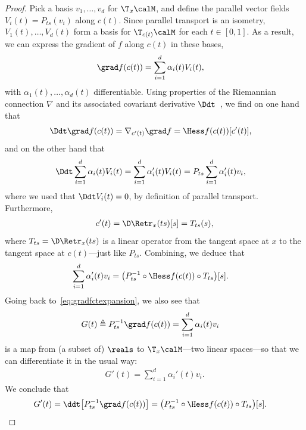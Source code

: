 \begin{proof}
	Pick a basis $v_1, \ldots, v_d$ for $\T_x\calM$, and define the parallel vector fields $V_i(t) = P_{ts}(v_i)$ along $c(t)$. Since parallel transport is an isometry, $V_1(t), \ldots, V_d(t)$ form a basis for $\T_{c(t)}\calM$ for each $t \in [0, 1]$. As a result, we can express the gradient of $f$ along $c(t)$ in these bases,
	\begin{align}
		\grad f(c(t)) & = \sum_{i = 1}^{d} \alpha_i(t) V_i(t),
		\label{eq:gradfctexpansion}
	\end{align}
	with $\alpha_1(t), \ldots, \alpha_d(t)$ differentiable. Using properties of the Riemannian connection $\nabla$ and its associated covariant derivative $\Ddt$~\cite[pp59--67]{oneill}, we find on one hand that
	\begin{align*}
		\Ddt \grad f(c(t)) & = \nabla_{c'(t)} \grad f = \Hess f(c(t))[c'(t)],
	\end{align*}
	and on the other hand that
	\begin{align*}
		\Ddt \sum_{i = 1}^{d} \alpha_i(t) V_i(t) & = \sum_{i = 1}^{d} \alpha_i'(t) V_i(t) = P_{ts} \sum_{i = 1}^{d} \alpha_i'(t) v_i,
	\end{align*}
	where we used that $\Ddt V_i(t) = 0$, by definition of parallel transport.
	Furthermore,
	\begin{align*}
		c'(t) = \D\Retr_x(ts)[s] = T_{ts}(s),
	\end{align*}
	where $T_{ts} = \D\Retr_x(ts)$ is a linear operator from the tangent space at $x$ to the tangent space at $c(t)$---just like $P_{ts}$.
	Combining, we deduce that
	\begin{align*}
		\sum_{i = 1}^d \alpha_i'(t) v_i & = \left(P_{ts}^{-1} \circ \Hess f(c(t)) \circ T_{ts}\right)\![s].
	\end{align*}
	Going back to~\eqref{eq:gradfctexpansion}, we also see that
	\begin{align*}
		G(t) & \triangleq P_{ts}^{-1} \grad f(c(t)) = \sum_{i = 1}^{d} \alpha_i(t) v_i
	\end{align*}
	is a map from (a subset of) $\reals$ to $\T_x\calM$---two linear spaces---so that we can differentiate it in the usual way:
	\begin{align*}
		G'(t) = \sum_{i = 1}^{d} \alpha_i'(t) v_i.
	\end{align*}
	We conclude that
	\begin{align}
		G'(t) = \ddt\!\left[ P_{ts}^{-1} \grad f(c(t)) \right] & = \left(P_{ts}^{-1} \circ \Hess f(c(t)) \circ T_{ts}\right)\![s].
		\label{eq:ddtptsinvgradfct}

\end{align}
\end{proof}
